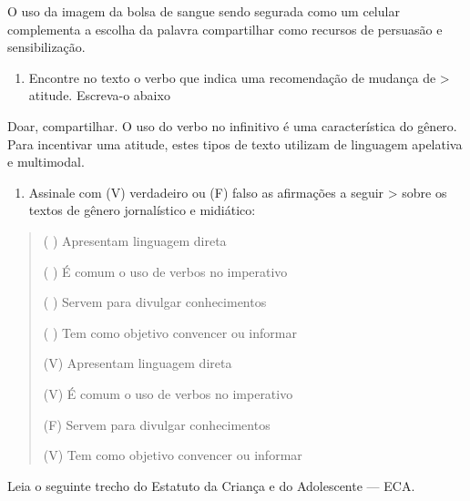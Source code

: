 O uso da imagem da bolsa de sangue sendo segurada como um celular
complementa a escolha da palavra compartilhar como recursos de persuasão
e sensibilização.

\begin{enumerate}
\def\labelenumi{\arabic{enumi})}
\setcounter{enumi}{1}
\tightlist
\item
  Encontre no texto o verbo que indica uma recomendação de mudança de
  \textgreater{} atitude. Escreva-o abaixo
\end{enumerate}

Doar, compartilhar. O uso do verbo no infinitivo é uma característica do
gênero. Para incentivar uma atitude, estes tipos de texto utilizam de
linguagem apelativa e multimodal.

\begin{enumerate}
\def\labelenumi{\arabic{enumi})}
\setcounter{enumi}{2}
\tightlist
\item
  Assinale com (V) verdadeiro ou (F) falso as afirmações a seguir
  \textgreater{} sobre os textos de gênero jornalístico e midiático:
\end{enumerate}

\begin{quote}
( ) Apresentam linguagem direta

( ) É comum o uso de verbos no imperativo

( ) Servem para divulgar conhecimentos

( ) Tem como objetivo convencer ou informar

(V) Apresentam linguagem direta

(V) É comum o uso de verbos no imperativo

(F) Servem para divulgar conhecimentos

(V) Tem como objetivo convencer ou informar
\end{quote}

Leia o seguinte trecho do Estatuto da Criança e do Adolescente --- ECA.

